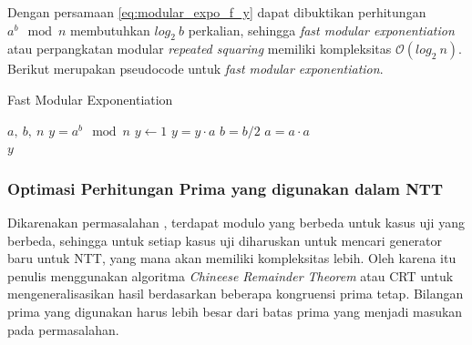 Dengan persamaan \eqref{eq:modular_expo_f_y} dapat dibuktikan perhitungan $ a^b \mod{n} $ membutuhkan $ log_2\ b $ perkalian, sehingga \textit{fast modular exponentiation} atau perpangkatan modular \textit{repeated squaring} memiliki kompleksitas $ \mathcal{O}{(log_2\ n)} $. Berikut merupakan pseudocode untuk \textit{fast modular exponentiation}.
\begin{algorithm}
	\caption{Fast Modular Exponentiation}
	\label{psdo:fast_modex}
	\begin{algorithmic}[1]
		\Require $a,\ b,\ n$
		\Ensure $y = a^b\mod{n}$
		\State $y \leftarrow 1$
				\State $ y = y \cdot a $
			\EndIf
			\State $ b = b / 2 $
			\State $ a = a \cdot a $
		\EndWhile \\
		\Return $ y $
	\end{algorithmic}
\end{algorithm}

\subsubsection{ Optimasi Perhitungan Prima yang digunakan dalam NTT}

Dikarenakan permasalahan \soal, terdapat modulo yang berbeda untuk kasus uji yang berbeda, sehingga untuk setiap kasus uji diharuskan untuk mencari generator baru untuk NTT, yang mana akan memiliki kompleksitas lebih. Oleh karena itu penulis menggunakan algoritma \textit{Chineese Remainder Theorem} atau CRT untuk mengeneralisasikan hasil berdasarkan beberapa kongruensi prima tetap. Bilangan prima yang digunakan harus lebih besar dari batas prima yang menjadi masukan pada permasalahan.

